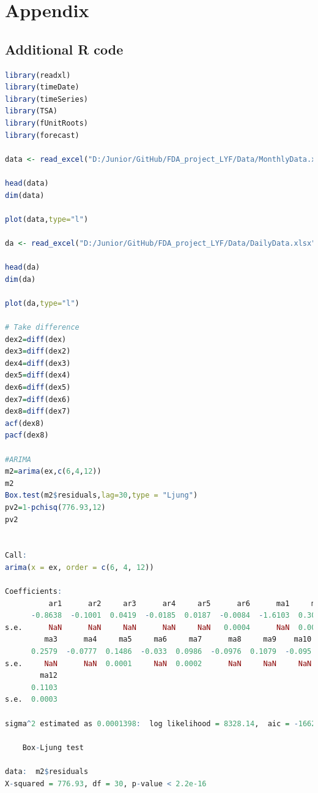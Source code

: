 \documentclass[12pt, a4paper, titlepage]{article}
\begin{document}
\section{Appendix}
\subsection{Additional R code}
\begin{lstlisting}[language=R] 
library(readxl)
library(timeDate)
library(timeSeries)
library(TSA)
library(fUnitRoots)
library(forecast)

data <- read_excel("D:/Junior/GitHub/FDA_project_LYF/Data/MonthlyData.xls")

head(data)
dim(data)

plot(data,type="l")

da <- read_excel("D:/Junior/GitHub/FDA_project_LYF/Data/DailyData.xlsx")

head(da)
dim(da)

plot(da,type="l")

# Take difference
dex2=diff(dex)
dex3=diff(dex2)
dex4=diff(dex3)
dex5=diff(dex4)
dex6=diff(dex5)
dex7=diff(dex6)
dex8=diff(dex7)
acf(dex8)
pacf(dex8)

#ARIMA
m2=arima(ex,c(6,4,12))
m2
Box.test(m2$residuals,lag=30,type = "Ljung")
pv2=1-pchisq(776.93,12)
pv2


Call:
arima(x = ex, order = c(6, 4, 12))

Coefficients:
          ar1      ar2     ar3      ar4     ar5      ar6      ma1     ma2
      -0.8638  -0.1001  0.0419  -0.0185  0.0187  -0.0084  -1.6103  0.3084
s.e.      NaN      NaN     NaN      NaN     NaN   0.0004      NaN  0.0003
         ma3      ma4     ma5     ma6     ma7      ma8     ma9    ma10     ma11
      0.2579  -0.0777  0.1486  -0.033  0.0986  -0.0976  0.1079  -0.095  -0.1169
s.e.     NaN      NaN  0.0001     NaN  0.0002      NaN     NaN     NaN   0.0004
        ma12
      0.1103
s.e.  0.0003

sigma^2 estimated as 0.0001398:  log likelihood = 8328.14,  aic = -16620.28

	Box-Ljung test

data:  m2$residuals
X-squared = 776.93, df = 30, p-value < 2.2e-16
\end{lstlisting}
\end{document}
